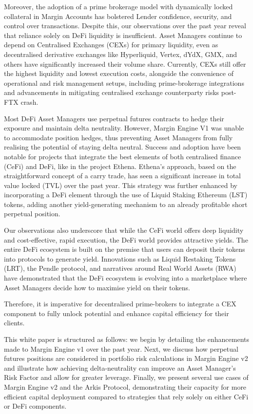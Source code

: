 \documentclass[conference]{IEEEtran}
\begin{document}
Moreover, the adoption of a prime brokerage model with dynamically locked collateral in Margin Accounts has bolstered Lender confidence, security, and control over transactions. Despite this, our observations over the past year reveal that reliance solely on DeFi liquidity is insufficient. Asset Managers continue to depend on Centralised Exchanges (CEXs) for primary liquidity, even as decentralised derivative exchanges like Hyperliquid, Vertex, dYdX, GMX, and others have significantly increased their volume share.\cite{coingecko-volumes} Currently, CEXs still offer the highest liquidity and lowest execution costs, alongside the convenience of operational and risk management setups, including prime-brokerage integrations and advancements in mitigating centralised exchange counterparty risks post-FTX crash.

Most DeFi Asset Managers use perpetual futures contracts to hedge their exposure and maintain delta neutrality. However, Margin Engine V1 was unable to accommodate position hedges, thus preventing Asset Managers from fully realising the potential of staying delta neutral. Success and adoption have been notable for projects that integrate the best elements of both centralised finance (CeFi) and DeFi, like in the project Ethena. Ethena's approach, based on the straightforward concept of a carry trade, has seen a significant increase in total value locked (TVL) over the past year. This strategy was further enhanced by incorporating a DeFi element through the use of Liquid Staking Ethereum (LST) tokens, adding another yield-generating mechanism to an already profitable short perpetual position.\cite{ethena-gitbook}

Our observations also underscore that while the CeFi world offers deep liquidity and cost-effective, rapid execution, the DeFi world provides attractive yields. The entire DeFi ecosystem is built on the premise that users can deposit their tokens into protocols to generate yield. Innovations such as Liquid Restaking Tokens (LRT), the Pendle protocol, and narratives around Real World Assets (RWA) have demonstrated that the DeFi ecosystem is evolving into a marketplace where Asset Managers decide how to maximise yield on their tokens.\cite{eigenlayer-whitepaper}\cite{pendle-whitepaper}

Therefore, it is imperative for decentralised prime-brokers to integrate a CEX component to fully unlock potential and enhance capital efficiency for their clients.

This white paper is structured as follows: we begin by detailing the enhancements made to Margin Engine v1 over the past year. Next, we discuss how perpetual futures positions are considered in portfolio risk calculations in Margin Engine v2 and illustrate how achieving delta-neutrality can improve an Asset Manager’s Risk Factor and allow for greater leverage. Finally, we present several use cases of Margin Engine v2 and the Arkis Protocol, demonstrating their capacity for more efficient capital deployment compared to strategies that rely solely on either CeFi or DeFi components.
 	
\end{document}
